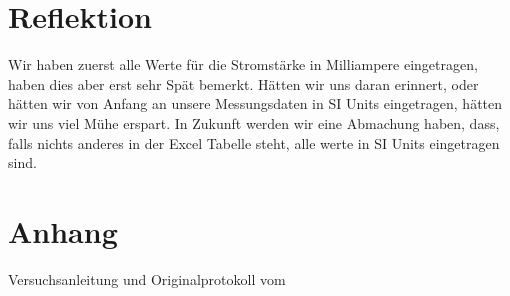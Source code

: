 \documentclass[12pt, a4paper, twoside]{article}
\begin{document}
\section{Reflektion}
Wir haben zuerst alle Werte für die Stromstärke in Milliampere eingetragen, haben dies aber erst sehr Spät bemerkt.
Hätten wir uns daran erinnert, oder hätten wir von Anfang an unsere Messungsdaten in SI Units eingetragen, hätten wir uns viel Mühe erspart.
In Zukunft werden wir eine Abmachung haben, dass, falls nichts anderes in der Excel Tabelle steht, alle werte in SI Units eingetragen sind.
\section{Anhang}
Versuchsanleitung und Originalprotokoll vom \labdate
\end{document}
